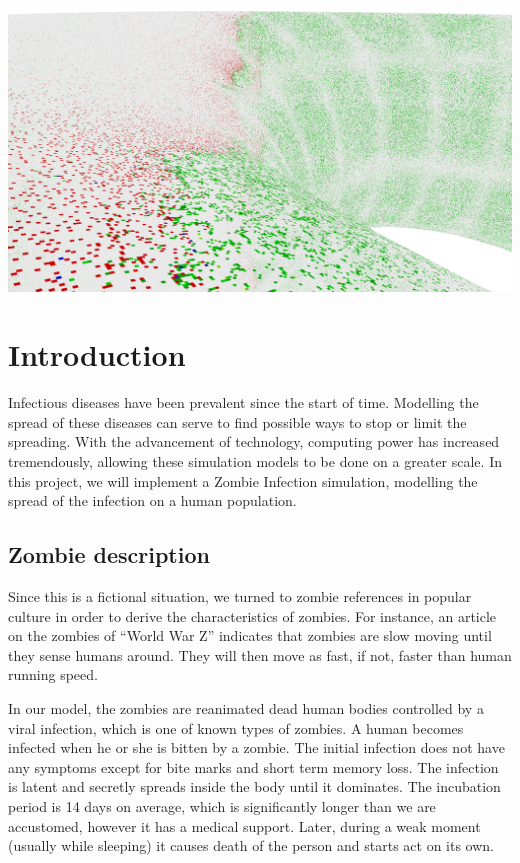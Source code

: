 \documentclass[a4paper]{article}
\title{\mytitle}
\author{Adam Juraszek \and Ryan Leong Wei Shiong \and Matthew Signorini \and Ziying Yang}
\begin{document}
\maketitle

\includegraphics[width=\textwidth]{torus/title}

\newpage
\tableofcontents
\newpage

\section{Introduction}

Infectious diseases have been prevalent since the start of time.
Modelling the spread of these diseases can serve to find possible ways to stop or limit the spreading.
With the advancement of technology, computing power has increased tremendously, allowing these simulation models to be done on a greater scale.
In this project, we will implement a Zombie Infection simulation, modelling the spread of the infection on a human population.

\subsection{Zombie description}

Since this is a fictional situation, we turned to zombie references in popular culture in order to derive the characteristics of zombies.
For instance, an article on the zombies of ``World War Z'' indicates that zombies are slow moving until they sense humans around.
They will then move as fast, if not, faster than human running speed. \cite{guidetozombies}

In our model, the zombies are reanimated dead human bodies controlled by a viral infection, which is one of known types of zombies. \cite{survivingthedead}
A human becomes infected when he or she is bitten by a zombie.
The initial infection does not have any symptoms except for bite marks and short term memory loss.
The infection is latent and secretly spreads inside the body until it dominates.
The incubation period is 14 days on average, which is significantly longer than we are accustomed, however it has a medical support. \cite{mogk2011everything}
Later, during a weak moment (usually while sleeping) it causes death of the person and starts act on its own.
\end{document}
